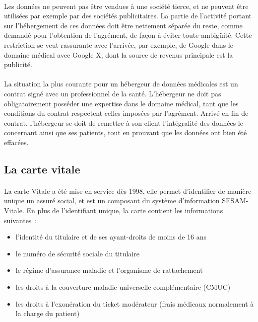 \paragraph{}
Les données ne peuvent pas être vendues à une société tierce, et ne peuvent
être utilisées par exemple par des sociétés publicitaires. La partie de
l'activité portant sur l'hébergement de ces données doit être nettement séparée
du reste, comme demandé pour l'obtention de l'agrément, de façon à éviter toute
ambigüité. Cette restriction se veut rassurante avec l'arrivée, par exemple, de
Google dans le domaine médical avec Google X, dont la source de revenus
principale est la publicité.

\paragraph{}
La situation la plus courante pour un hébergeur de données médicales est un
contrat signé avec un professionnel de la santé. L'hébergeur ne doit pas
obligatoirement posséder une expertise dans le domaine médical, tant que les
conditions du contrat respectent celles imposées par l'agrément. Arrivé en fin
de contrat, l'hébergeur se doit de remettre à son client l'intégralité des
données le concernant ainsi que ses patients, tout en prouvant que les données
ont bien été effacées.


        \subsection{La carte vitale}

\paragraph{}
La carte Vitale a été mise en service dès 1998, elle permet d'identifier de
manière unique un assuré social, et est un composant du système
d'information SESAM-Vitale. En plus de l'identifiant unique, la carte
contient les informations suivantes~:

\begin{itemize}
    \item l'identité du titulaire et de ses ayant-droits de moins de 16 ans
    \item le numéro de sécurité sociale du titulaire
    \item le régime d'assurance maladie et l'organisme de rattachement
    \item les droits à la couverture maladie universelle complémentaire (CMUC)
    \item les droits à l'exonération du ticket modérateur (frais médicaux normalement à la charge du patient)
\end{itemize}

